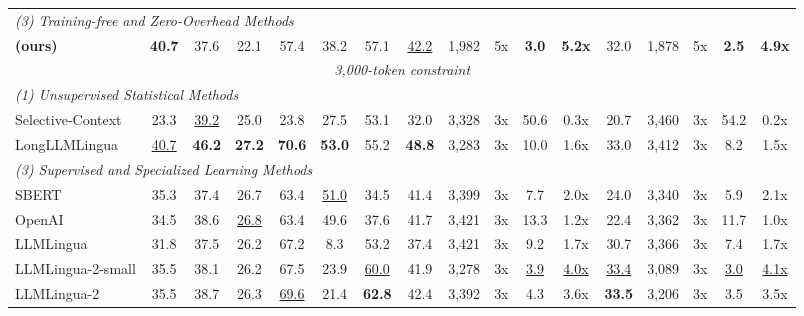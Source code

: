 \documentclass[11pt]{article}
\newcommand{\ours}{\text{BEAVER}\xspace}
\begin{document}
\begin{table}[t]
{\begin{tabular}{l | cccccc >{\columncolor{lightgray}}c | cc | cc | >{\columncolor{lightgray}}c | cc | cc}
            \midrule
            
            \multicolumn{17}{l}{\textit{(3) Training-free and Zero-Overhead Methods}} \\
            \rowcolor{blue!5} 
            \textbf{\ours (ours)} & \textbf{40.7} & 37.6 & 22.1 & 57.4 & 38.2 & 57.1 & \underline{42.2} & 1,982 & 5x & \textbf{3.0} & \textbf{5.2x} & 32.0 & 1,878 & 5x & \textbf{2.5} & \textbf{4.9x} \\

            \midrule
            \hline
            \multicolumn{17}{c}{\textit{3,000-token constraint}} \\
            \hline

            \multicolumn{17}{l}{\textit{(1) Unsupervised Statistical Methods}} \\
            Selective-Context & 23.3 & \underline{39.2} & 25.0 & 23.8 & 27.5 & 53.1 & 32.0 & 3,328 & 3x & 50.6 & 0.3x & 20.7 & 3,460 & 3x & 54.2 & 0.2x \\
            LongLLMLingua & \underline{40.7} & \textbf{46.2} & \textbf{27.2} & \textbf{70.6} & \textbf{53.0} & 55.2 & \textbf{48.8} & 3,283 & 3x & 10.0 & 1.6x & 33.0 & 3,412 & 3x & 8.2 & 1.5x \\
            
            \midrule
            \multicolumn{17}{l}{\textit{(3) Supervised and Specialized Learning Methods}} \\
            SBERT & 35.3 & 37.4 & 26.7 & 63.4 & \underline{51.0} & 34.5 & 41.4 & 3,399 & 3x & 7.7 & 2.0x & 24.0 & 3,340 & 3x & 5.9 & 2.1x \\
            OpenAI & 34.5 & 38.6 & \underline{26.8} & 63.4 & 49.6 & 37.6 & 41.7 & 3,421 & 3x & 13.3 & 1.2x & 22.4 & 3,362 & 3x & 11.7 & 1.0x \\
            LLMLingua & 31.8 & 37.5 & 26.2 & 67.2 & 8.3 & 53.2 & 37.4 & 3,421 & 3x & 9.2 & 1.7x & 30.7 & 3,366 & 3x & 7.4 & 1.7x \\
            LLMLingua-2-small & 35.5 & 38.1 & 26.2 & 67.5 & 23.9 & \underline{60.0} & 41.9 & 3,278 & 3x & \underline{3.9} & \underline{4.0x} & \underline{33.4} & 3,089 & 3x & \underline{3.0} & \underline{4.1x} \\
            LLMLingua-2 & 35.5 & 38.7 & 26.3 & \underline{69.6} & 21.4 & \textbf{62.8} & 42.4 & 3,392 & 3x & 4.3 & 3.6x & \textbf{33.5} & 3,206 & 3x & 3.5 & 3.5x \\
            

\end{tabular}}
\end{table}
\end{document}
